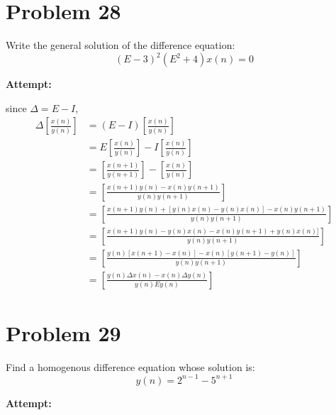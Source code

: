 \documentclass[12pt,letterpaper]{article}
\theoremstyle{definition}
\begin{document}
\section*{Problem 28}

Write the general solution of the difference equation:
\begin{equation*}
    (E-3)^2(E^2+4)x(n)=0
\end{equation*}



\textbf{Attempt:}

    \begin{changemargin}{.5cm}{0cm}
        since $\Delta = E-I$,
        \begin{align*}
            \Delta\left[\frac{x(n)}{y(n)}\right] &= (E-I)\left[\frac{x(n)}{y(n)}\right]\\
            &= E\left[\frac{x(n)}{y(n)}\right] -I\left[\frac{x(n)}{y(n)}\right] \\
            &=\left[\frac{x(n+1)}{y(n+1)}\right] -\left[\frac{x(n)}{y(n)}\right] \\
            &= \left[\frac{x(n+1)y(n)-x(n)y(n+1)}{y(n)y(n+1)}\right] \\
            &=\left[\frac{x(n+1)y(n)+[y(n)x(n)-y(n)x(n)]-x(n)y(n+1)}{y(n)y(n+1)}\right] \\
            &=\left[\frac{x(n+1)y(n)-y(n)x(n)-x(n)y(n+1)+y(n)x(n)]}{y(n)y(n+1)}\right] \\
            &=\left[\frac{y(n)[x(n+1)-x(n)]-x(n)[y(n+1)-y(n)]}{y(n)y(n+1)}\right] \\
            &=\left[\frac{y(n)\Delta x(n)-x(n)\Delta y(n)}{y(n)Ey(n)}\right]
        \end{align*}

    \end{changemargin}





\newpage

%

\section*{Problem 29}

Find a homogenous difference equation whose solution is:
\begin{equation*}
    y(n) = 2^{n-1}-5^{n+1}
\end{equation*}


\textbf{Attempt:}
\end{document}
